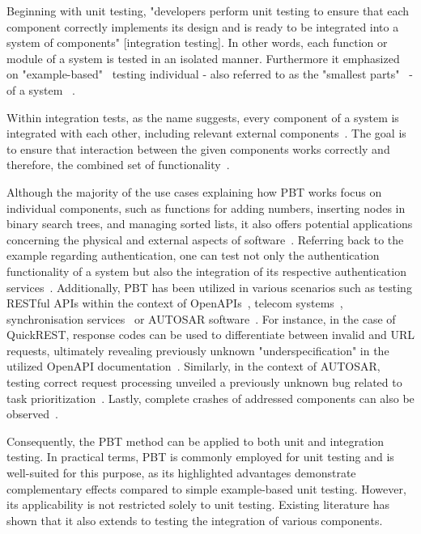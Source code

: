 \documentclass[runningheads]{llncs}
\begin{document}
Beginning with unit testing, "developers perform unit testing to ensure that each component correctly implements its design and is ready to be integrated into a system of components" [integration testing]. In other words, each function or module of a system is tested in an isolated manner. Furthermore it emphasized on "example-based"~\cite{Corgozinho2023} testing individual - also referred to as the "smallest parts"~\cite{Aniche2022} - of a system ~\cite{Hartmann2000,Corgozinho2023}.

Within integration tests, as the name suggests, every component of a system is integrated with each other, including relevant external components~\cite{Aniche2022,Hartmann2000,Radziwill2020}. The goal is to ensure that interaction between the given components works correctly and therefore, the combined set of functionality~\cite{Hartmann2000,Aniche2022}.

Although the majority of the use cases explaining how PBT works focus on individual components, such as functions for adding numbers, inserting nodes in binary search trees, 
and managing sorted lists, it also offers potential applications concerning the physical and external aspects of software~\cite{Chen2022}. Referring back to the example regarding authentication, one can test not only the authentication functionality of a system but also the integration of its respective authentication services~\cite{Fink1997}. Additionally, PBT has been utilized in various scenarios such as testing RESTful APIs within the context of OpenAPIs~\cite{Karlsson2019}, telecom systems~\cite{Arts2006}, synchronisation services~\cite{Hughes2016} or AUTOSAR software~\cite{Arts2015}. For instance, in the case of QuickREST, response codes can be used to differentiate between invalid and URL requests, ultimately revealing previously unknown "underspecification" in the utilized OpenAPI documentation~\cite{Karlsson2019}. Similarly, in the context of AUTOSAR, testing correct request processing unveiled a previously unknown bug related to task prioritization~\cite{Arts2015}. Lastly, complete crashes of addressed components can also be observed~\cite{Arts2006}.

Consequently, the PBT method can be applied to both unit and integration testing. In practical terms, PBT is commonly employed for unit testing and is well-suited for this purpose, as its highlighted advantages demonstrate complementary effects compared to simple example-based unit testing. However, its applicability is not restricted solely to unit testing. Existing literature has shown that it also extends to testing the integration of various components.
\end{document}
